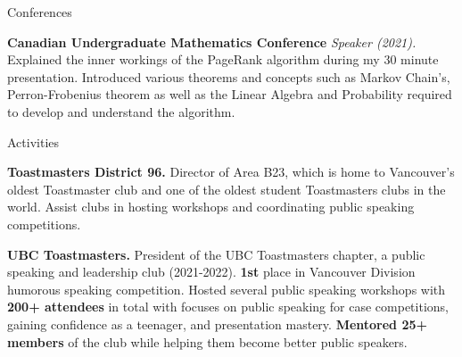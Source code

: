 

\begin{rSection}{Conferences}
\vspace{-1.25em}
\item \textbf{Canadian Undergraduate Mathematics Conference} \textit{Speaker (2021). } {Explained the inner workings of the PageRank algorithm during my 30 minute presentation. Introduced various theorems and concepts such as Markov Chain’s, Perron-Frobenius theorem as well as the Linear Algebra and Probability required to develop and understand the algorithm.}

\end{rSection} 





\begin{rSection}{Activities}
\vspace{-1.25em}
\item \textbf{Toastmasters District 96.} {Director of Area B23, which is home to Vancouver's oldest Toastmaster club and one of the oldest student Toastmasters clubs in the world. Assist clubs in hosting workshops and coordinating public speaking competitions.}

\item \textbf{UBC Toastmasters.} {President of the UBC Toastmasters chapter, a public speaking and leadership club (2021-2022). \textbf{1st} place in Vancouver Division humorous speaking competition. Hosted several public speaking workshops with \textbf{200+ attendees} in total  with focuses on public speaking for case competitions, gaining confidence as a teenager, and presentation mastery. \textbf{Mentored 25+ members} of the club while helping them become better public speakers. }
\end{rSection} 




